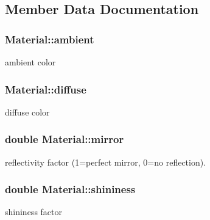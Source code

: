\subsection{Member Data Documentation}
\subsubsection[{\texorpdfstring{ambient}{ambient}}]{ Material\+::ambient}\hypertarget{structMaterial_a7b24ee4bc74363181053123fd99e180c}{}\label{structMaterial_a7b24ee4bc74363181053123fd99e180c}


ambient color 

\subsubsection[{\texorpdfstring{diffuse}{diffuse}}]{ Material\+::diffuse}\hypertarget{structMaterial_a17ee727d124d7a47afd6038e09fe76dd}{}\label{structMaterial_a17ee727d124d7a47afd6038e09fe76dd}


diffuse color 

\subsubsection[{\texorpdfstring{mirror}{mirror}}]{\setlength{\rightskip}{0pt plus 5cm}double Material\+::mirror}\hypertarget{structMaterial_a0dbe6293086abea5d497ec9000ab9f0a}{}\label{structMaterial_a0dbe6293086abea5d497ec9000ab9f0a}


reflectivity factor (1=perfect mirror, 0=no reflection). 

\subsubsection[{\texorpdfstring{shininess}{shininess}}]{\setlength{\rightskip}{0pt plus 5cm}double Material\+::shininess}\hypertarget{structMaterial_a3ebd453f91d79ab97ec25632d3ba5959}{}\label{structMaterial_a3ebd453f91d79ab97ec25632d3ba5959}


shininess factor 

